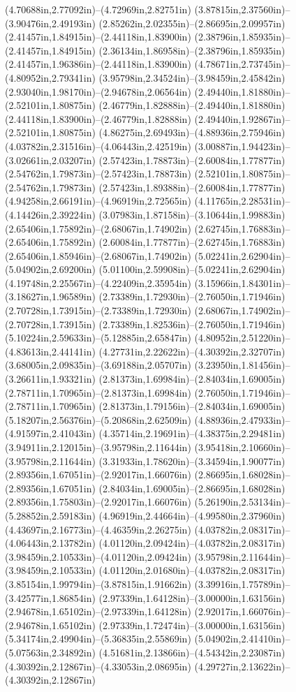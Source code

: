 (4.70688in,2.77092in)--(4.72969in,2.82751in) (3.87815in,2.37560in)--(3.90476in,2.49193in) (2.85262in,2.02355in)--(2.86695in,2.09957in) (2.41457in,1.84915in)--(2.44118in,1.83900in) (2.38796in,1.85935in)--(2.41457in,1.84915in) (2.36134in,1.86958in)--(2.38796in,1.85935in) (2.41457in,1.96386in)--(2.44118in,1.83900in) (4.78671in,2.73745in)--(4.80952in,2.79341in) (3.95798in,2.34524in)--(3.98459in,2.45842in) (2.93040in,1.98170in)--(2.94678in,2.06564in) (2.49440in,1.81880in)--(2.52101in,1.80875in) (2.46779in,1.82888in)--(2.49440in,1.81880in) (2.44118in,1.83900in)--(2.46779in,1.82888in) (2.49440in,1.92867in)--(2.52101in,1.80875in) (4.86275in,2.69493in)--(4.88936in,2.75946in) (4.03782in,2.31516in)--(4.06443in,2.42519in) (3.00887in,1.94423in)--(3.02661in,2.03207in) (2.57423in,1.78873in)--(2.60084in,1.77877in) (2.54762in,1.79873in)--(2.57423in,1.78873in) (2.52101in,1.80875in)--(2.54762in,1.79873in) (2.57423in,1.89388in)--(2.60084in,1.77877in) (4.94258in,2.66191in)--(4.96919in,2.72565in) (4.11765in,2.28531in)--(4.14426in,2.39224in) (3.07983in,1.87158in)--(3.10644in,1.99883in) (2.65406in,1.75892in)--(2.68067in,1.74902in) (2.62745in,1.76883in)--(2.65406in,1.75892in) (2.60084in,1.77877in)--(2.62745in,1.76883in) (2.65406in,1.85946in)--(2.68067in,1.74902in) (5.02241in,2.62904in)--(5.04902in,2.69200in) (5.01100in,2.59908in)--(5.02241in,2.62904in) (4.19748in,2.25567in)--(4.22409in,2.35954in) (3.15966in,1.84301in)--(3.18627in,1.96589in) (2.73389in,1.72930in)--(2.76050in,1.71946in) (2.70728in,1.73915in)--(2.73389in,1.72930in) (2.68067in,1.74902in)--(2.70728in,1.73915in) (2.73389in,1.82536in)--(2.76050in,1.71946in) (5.10224in,2.59633in)--(5.12885in,2.65847in) (4.80952in,2.51220in)--(4.83613in,2.44141in) (4.27731in,2.22622in)--(4.30392in,2.32707in) (3.68005in,2.09835in)--(3.69188in,2.05707in) (3.23950in,1.81456in)--(3.26611in,1.93321in) (2.81373in,1.69984in)--(2.84034in,1.69005in) (2.78711in,1.70965in)--(2.81373in,1.69984in) (2.76050in,1.71946in)--(2.78711in,1.70965in) (2.81373in,1.79156in)--(2.84034in,1.69005in) (5.18207in,2.56376in)--(5.20868in,2.62509in) (4.88936in,2.47933in)--(4.91597in,2.41043in) (4.35714in,2.19691in)--(4.38375in,2.29481in) (3.94911in,2.12015in)--(3.95798in,2.11644in) (3.95418in,2.10660in)--(3.95798in,2.11644in) (3.31933in,1.78620in)--(3.34594in,1.90077in) (2.89356in,1.67051in)--(2.92017in,1.66076in) (2.86695in,1.68028in)--(2.89356in,1.67051in) (2.84034in,1.69005in)--(2.86695in,1.68028in) (2.89356in,1.75803in)--(2.92017in,1.66076in) (5.26190in,2.53134in)--(5.28852in,2.59183in) (4.96919in,2.44664in)--(4.99580in,2.37960in) (4.43697in,2.16773in)--(4.46359in,2.26275in) (4.03782in,2.08317in)--(4.06443in,2.13782in) (4.01120in,2.09424in)--(4.03782in,2.08317in) (3.98459in,2.10533in)--(4.01120in,2.09424in) (3.95798in,2.11644in)--(3.98459in,2.10533in) (4.01120in,2.01680in)--(4.03782in,2.08317in) (3.85154in,1.99794in)--(3.87815in,1.91662in) (3.39916in,1.75789in)--(3.42577in,1.86854in) (2.97339in,1.64128in)--(3.00000in,1.63156in) (2.94678in,1.65102in)--(2.97339in,1.64128in) (2.92017in,1.66076in)--(2.94678in,1.65102in) (2.97339in,1.72474in)--(3.00000in,1.63156in) (5.34174in,2.49904in)--(5.36835in,2.55869in) (5.04902in,2.41410in)--(5.07563in,2.34892in) (4.51681in,2.13866in)--(4.54342in,2.23087in) (4.30392in,2.12867in)--(4.33053in,2.08695in) (4.29727in,2.13622in)--(4.30392in,2.12867in) 